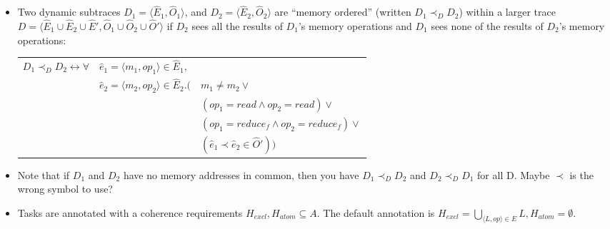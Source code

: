 \begin{itemize}
\begin{itemize}

\item $\forall m . \langle m, read \rangle \in \hat E \rightarrow \exists L . \alpha(m) \in L \wedge \langle L, read \rangle \in E$

\item $\forall m . \langle m, write \rangle \in \hat E \rightarrow \exists L . \alpha(m) \in L \wedge \langle L, write \rangle \in E$

\item $\forall m, f . \langle m, reduce_f \rangle \in \hat E \rightarrow ( \exists L . \alpha(m) \in L \wedge \langle L, reduce_f \rangle \in E ) \vee ( \exists L_1, L_2 . \alpha(m) \in L_1 \wedge \langle L_1, read \rangle \in E \wedge \alpha(m) \in L_2 \wedge \langle L_2, write \rangle \in E )$

\end{itemize}

\item Two dynamic subtraces $D_1 = \langle \hat E_1, \hat O_1 \rangle$, and $D_2 = \langle \hat E_2, \hat O_2 \rangle$ are ``memory ordered'' (written $D_1 \prec_D D_2$) within a larger trace $D = \langle \hat E_1 \cup \hat E_2 \cup \hat E', \hat O_1 \cup \hat O_2 \cup \hat O' \rangle$ if $D_2$ sees all the results of $D_1$'s memory operations and $D_1$ sees none of the results of $D_2$'s memory operations:

\begin{tabular}{l@{}l@{}l}
$D_1 \prec_D D_2 \leftrightarrow \forall$ & $\hat e_1 = \langle m_1, op_1 \rangle \in \hat E_1,$ \\
& $\hat e_2 = \langle m_2, op_2 \rangle \in \hat E_2 . \big($ & $m_1 \neq m_2 \vee$  \\
&& $( op_1 = read \wedge op_2 = read ) \vee$ \\
&& $( op_1 = reduce_f \wedge op_2 = reduce_f ) \vee$ \\
&& $( \hat e_1 \prec \hat e_2 \in \hat O' ) \big)$
\end{tabular}

\item Note that if $D_1$ and $D_2$ have no memory addresses in common, then you have $D_1 \prec_D D_2$ and $D_2 \prec_D D_1$ for all D.  Maybe $\prec$ is the wrong symbol to use?

\item Tasks are annotated with a coherence requirements $H_{excl}, H_{atom} \subseteq A$.  The default annotation is $H_{excl} = \bigcup_{\langle L, op \rangle \in E} L, H_{atom} = \emptyset$.


\end{itemize}
